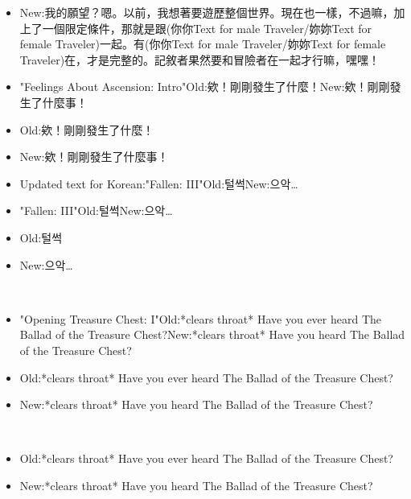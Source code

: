 \documentclass[a4paper,12pt]{article}
\begin{document}
\begin{itemize}
\item New:我的願望？嗯。以前，我想著要遊歷整個世界。現在也一樣，不過嘛，加上了一個限定條件，那就是跟(‍你你Text for male Traveler/妳妳Text for female Traveler‍)一起。有(‍你你Text for male Traveler/妳妳Text for female Traveler‍)在，才是完整的。記敘者果然要和冒險者在一起才行嘛，嘿嘿！
\item "Feelings About Ascension: Intro"Old:欸！剛剛發生了什麼！New:欸！剛剛發生了什麼事！
\item Old:欸！剛剛發生了什麼！
\item New:欸！剛剛發生了什麼事！
\item Updated text for Korean:"Fallen: III"Old:털썩New:으악…
\item "Fallen: III"Old:털썩New:으악…
\item Old:털썩
\item New:으악…
\end{itemize}\\ \par \vspace{0.5cm}

\begin{itemize}
\item "Opening Treasure Chest: I"Old:*clears throat* Have you ever heard The Ballad of the Treasure Chest?New:*clears throat* Have you heard The Ballad of the Treasure Chest?
\item Old:*clears throat* Have you ever heard The Ballad of the Treasure Chest?
\item New:*clears throat* Have you heard The Ballad of the Treasure Chest?
\end{itemize}\\ \par \vspace{0.5cm}

\begin{itemize}
\item Old:*clears throat* Have you ever heard The Ballad of the Treasure Chest?
\item New:*clears throat* Have you heard The Ballad of the Treasure Chest?
\end{itemize}\\ \par \vspace{0.5cm}
\end{document}
